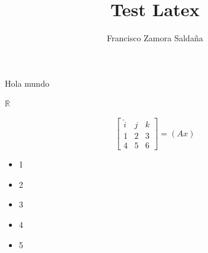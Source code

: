 \documentclass{article}
\title{Test Latex}
\author{Francisco Zamora Saldaña}
\theoremstyle{mytheoremstyle}
\theoremstyle{mytheoremstyle}
\theoremstyle{myproblemstyle}
\begin{document}
\maketitle
Hola mundo

\lipsum[2]

$\mathbb{R}$

\begin{equation}
    \begin{bmatrix}
        \hat{i} & j & k \\
        1       & 2 & 3 \\
        4       & 5 & 6
    \end{bmatrix}=(Ax)
\end{equation}

\begin{itemize}
    \item 1
    \item 2
    \item 3
    \item 4
    \item 5

\end{itemize}
\end{document}

